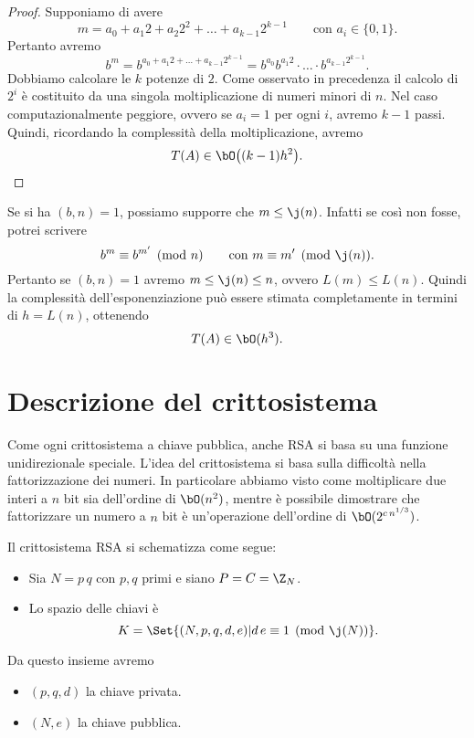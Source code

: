 	\begin{proof}
	Supponiamo di avere
		\[
		m = a_0 + a_1 2 + a_2 2^2 + \ldots + a_{k-1}2^{k-1} \qquad\text{con }a_i \in \{0,1\}.
		\]
	Pertanto avremo
		\[
		b^m = b^{a_0+a_1 2 + \ldots + a_{k-1}2^{k-1}} = b^{a_0}b^{a_1 2} \cdot\ldots\cdot b^{a_{k-1}2^{k-1}}.
		\]
	Dobbiamo calcolare le \(k\) potenze di \(2\). Come osservato in precedenza il calcolo di \(2^i\) è costituito da una singola moltiplicazione di numeri minori di \(n\). Nel caso computazionalmente peggiore, ovvero se \(a_i=1\) per ogni \(i\), avremo \(k-1\) passi.
	Quindi, ricordando la complessità della moltiplicazione, avremo
		\[
		T(A) \in \bO\big((k-1)h^2\big).
		\]
	\end{proof}

	\begin{oss}
	Se si ha \((b,n)=1\), possiamo supporre che \(m \le \j(n)\). Infatti se così non fosse, potrei scrivere
		\[
		b^m \equiv b^{m'} \pmod{n} \qquad\text{con } m \equiv m' \pmod{\j(n)}.
		\]
	Pertanto se \((b,n)=1\) avremo \(m \le \j(n) \le n\), ovvero \(L(m) \le L(n)\).
	Quindi la complessità dell'esponenziazione può essere stimata completamente in termini di \(h=L(n)\), ottenendo
		\[
		T(A) \in \bO(h^3).
		\]
	\end{oss}
%
%
\section{Descrizione del crittosistema}

	Come ogni crittosistema a chiave pubblica, anche RSA si basa su una funzione unidirezionale speciale.
	L'idea del crittosistema si basa sulla difficoltà nella fattorizzazione dei numeri.
	In particolare abbiamo visto come moltiplicare due interi a \(n\) bit sia dell'ordine di \(\bO(n^2)\), mentre è possibile dimostrare che fattorizzare un numero a \(n\) bit è un'operazione dell'ordine di \(\bO(2^{c\,n^{1/3}})\).

	Il crittosistema RSA si schematizza come segue:
	\begin{itemize}
		\item Sia \(N=p\,q\) con \(p,q\) primi e siano \(P=C=\Z_N\).
		\item Lo spazio delle chiavi è
			\[
			K = \Set{(N,p,q,d,e) | d\,e \equiv 1 \pmod{\j(N)}}.
			\]
	\end{itemize}

	Da questo insieme avremo
	\begin{itemize}
		\item \((p,q,d)\) la chiave privata.
		\item \((N,e)\) la chiave pubblica.
	\end{itemize}

